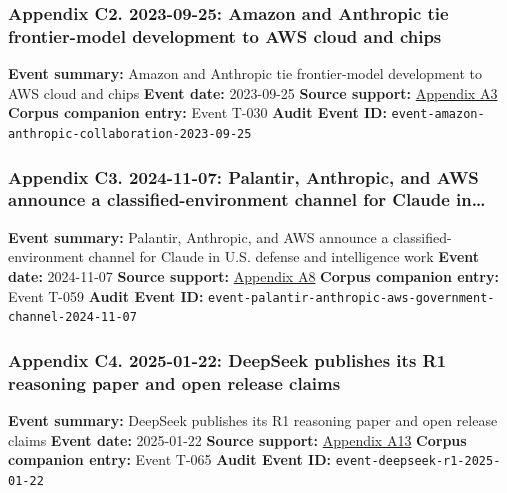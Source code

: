 \documentclass[
  american,
  11pt,
  letterpaper,
]{article}
\begin{document}
\subsubsection{Appendix C2. 2023-09-25: Amazon and Anthropic tie
frontier-model development to AWS cloud and
chips}\label{ch-07-appendix-c2-2023-09-25-amazon-and-anthropic-tie-frontier-model-development-to-aws-cloud-and-chips}

\textbf{Event summary:} Amazon and Anthropic tie frontier-model
development to AWS cloud and chips \textbf{Event date:} 2023-09-25
\textbf{Source support:}
\hyperref[ch-07-appendix-a3-amazon-and-anthropic-announce-strategic-collaboration-to-advance-generative-ai]{Appendix
A3} \textbf{Corpus companion entry:} Event T-030 \textbf{Audit Event
ID:} \texttt{event-amazon-anthropic-collaboration-2023-09-25}

\subsubsection{Appendix C3. 2024-11-07: Palantir, Anthropic, and AWS
announce a classified-environment channel for Claude
in\ldots{}}\label{ch-07-appendix-c3-2024-11-07-palantir-anthropic-and-aws-announce-a-classified-environment-channel-for-claude-in-u-s-defense-and-intelligence-work}

\textbf{Event summary:} Palantir, Anthropic, and AWS announce a
classified-environment channel for Claude in U.S. defense and
intelligence work \textbf{Event date:} 2024-11-07 \textbf{Source
support:}
\hyperref[ch-07-appendix-a8-anthropic-and-palantir-partner-to-bring-claude-ai-models-to-aws-for-u-s-government-intelligence-and-defense-operations]{Appendix
A8} \textbf{Corpus companion entry:} Event T-059 \textbf{Audit Event
ID:} \texttt{event-palantir-anthropic-aws-government-channel-2024-11-07}

\subsubsection{Appendix C4. 2025-01-22: DeepSeek publishes its R1
reasoning paper and open release
claims}\label{ch-07-appendix-c4-2025-01-22-deepseek-publishes-its-r1-reasoning-paper-and-open-release-claims}

\textbf{Event summary:} DeepSeek publishes its R1 reasoning paper and
open release claims \textbf{Event date:} 2025-01-22 \textbf{Source
support:}
\hyperref[ch-07-appendix-a13-deepseek-r1-incentivizing-reasoning-capability-in-llms-via-reinforcement-learning]{Appendix
A13} \textbf{Corpus companion entry:} Event T-065 \textbf{Audit Event
ID:} \texttt{event-deepseek-r1-2025-01-22}
\end{document}
